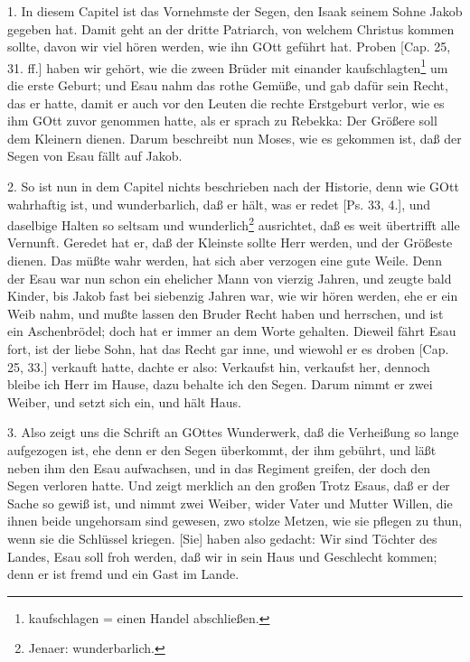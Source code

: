 1. In diesem Capitel ist das Vornehmste der Segen, den Isaak seinem Sohne Jakob gegeben hat. Damit geht an der dritte Patriarch, von welchem Christus kommen sollte, davon wir viel hören werden, wie ihn GOtt geführt hat. Proben [Cap. 25, 31. ff.] haben wir gehört, wie die zween Brüder mit einander kaufschlagten\footnote{kaufschlagen = einen Handel abschließen.} um die erste Geburt; und Esau nahm das rothe Gemüße, und gab dafür sein Recht, das er hatte, damit er auch vor den Leuten die rechte Erstgeburt verlor, wie es ihm GOtt zuvor genommen hatte, als er sprach zu Rebekka: Der Größere soll dem Kleinern dienen. Darum beschreibt nun Moses, wie es gekommen ist, daß der Segen von Esau fällt auf Jakob.

2. So ist nun in dem Capitel nichts beschrieben nach der Historie, denn wie GOtt wahrhaftig ist, und wunderbarlich, daß er hält, was er redet [Ps. 33, 4.], und daselbige Halten so seltsam und wunderlich\footnote{Jenaer: wunderbarlich.} ausrichtet, daß es weit übertrifft alle Vernunft. Geredet hat er, daß der Kleinste sollte Herr werden, und der Größeste dienen. Das müßte wahr werden, hat sich aber verzogen eine gute Weile. Denn der Esau war nun schon ein ehelicher Mann von vierzig Jahren, und zeugte bald Kinder, bis Jakob fast bei siebenzig Jahren war, wie wir hören werden, ehe er ein Weib nahm, und mußte lassen den Bruder Recht haben und herrschen, und ist ein Aschenbrödel; doch hat er immer an dem Worte gehalten. Dieweil fährt Esau fort, ist der liebe Sohn, hat das Recht gar inne, und wiewohl er es droben [Cap. 25, 33.] verkauft hatte, dachte er also: Verkaufst hin, verkaufst her, dennoch bleibe ich Herr im Hause, dazu behalte ich den Segen. Darum nimmt er zwei Weiber, und setzt sich ein, und hält Haus.

3. Also zeigt uns die Schrift an GOttes Wunderwerk, daß die Verheißung so lange aufgezogen
ist, ehe denn er den Segen überkommt, der ihm gebührt, und läßt neben ihm den Esau aufwachsen, und in das Regiment greifen, der doch den Segen verloren hatte. Und zeigt merklich an den großen Trotz Esaus, daß er der Sache so gewiß ist, und nimmt zwei Weiber, wider Vater und Mutter Willen, die ihnen beide ungehorsam sind gewesen, zwo stolze Metzen, wie sie pflegen zu thun, wenn sie die Schlüssel kriegen. [Sie] haben also gedacht: Wir sind Töchter des Landes, Esau soll froh werden, daß wir in sein Haus und Geschlecht kommen; denn er ist fremd und ein Gast im Lande.

